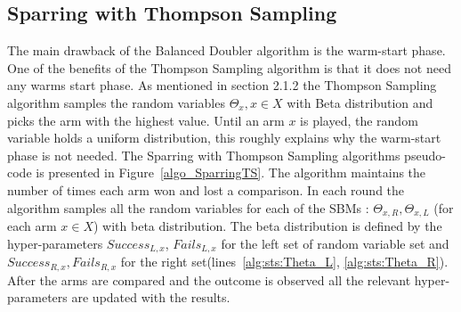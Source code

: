\documentclass{llncs}
\begin{document}
%	
%	
%	
%	
	
	\subsection{Sparring with Thompson Sampling}
	The main drawback of the Balanced Doubler algorithm is the warm-start phase.
	One of the benefits of the Thompson Sampling algorithm is that it does not need any warms start phase. 
	As mentioned in section 2.1.2 the Thompson Sampling algorithm samples the random variables $\Theta_x, x\in X$ with Beta distribution and picks the arm with the highest value.
	Until an arm $x$ is played, the random variable holds a uniform distribution, this roughly explains why the warm-start phase is not needed.
		The Sparring with Thompson Sampling algorithms pseudo-code is presented in Figure~\ref{algo_SparringTS}.
		The algorithm maintains the number of times each arm won and lost a comparison.
		In each round the algorithm samples all the random variables for each of the SBMs : $\Theta_{x,R}, \Theta_{x,L}$ (for each arm $x \in X$) with beta distribution. 
		The beta distribution is defined by the hyper-parameters $Success_{L,x}$, $Fails_{L,x}$ for the left set of random variable set and $Success_{R,x}, Fails_{R,x}$ for the right set(lines~\ref{alg:sts:Theta_L}, \ref{alg:sts:Theta_R}).
		After the arms are compared and the outcome is observed all the relevant hyper-parameters are updated with the results.
		
\end{document}
